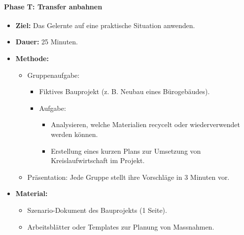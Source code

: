 \documentclass[
11pt,
captions=tableheading,
smallheadings,
headsepline,
footsepline, 
captions=tableheading,
parskip=half-,
]{scrartcl}
\begin{document}
\paragraph{Phase T: Transfer anbahnen}
\begin{itemize}
    \item \textbf{Ziel:} Das Gelernte auf eine praktische Situation anwenden.
    \item \textbf{Dauer:} 25 Minuten.
    \item \textbf{Methode:}
    \begin{itemize}
        \item Gruppenaufgabe:
        \begin{itemize}
            \item Fiktives Bauprojekt (z. B. Neubau eines Bürogebäudes).
            \item Aufgabe:
            \begin{itemize}
                \item Analysieren, welche Materialien recycelt oder wiederverwendet werden können.
                \item Erstellung eines kurzen Plans zur Umsetzung von Kreislaufwirtschaft im Projekt.
            \end{itemize}
        \end{itemize}
        \item Präsentation: Jede Gruppe stellt ihre Vorschläge in 3 Minuten vor.
    \end{itemize}
    \item \textbf{Material:}
    \begin{itemize}
        \item Szenario-Dokument des Bauprojekts (1 Seite).
        \item Arbeitsblätter oder Templates zur Planung von Massnahmen.
    \end{itemize}
\end{itemize}
\end{document}
